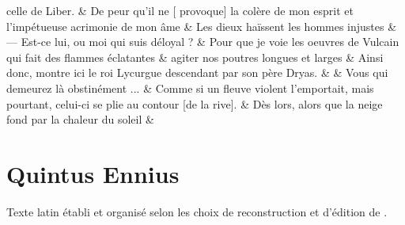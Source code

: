\documentclass[12pt,onecolumn,twoside,a4paper]{memoir}
\begin{document}
\begin{pairs}
\begin{Rightside}
                              celle de Liber. \&
                         \stanza 
                     De peur qu’il ne [ provoque] la colère de mon esprit et l’impétueuse
                              acrimonie de mon âme  \&
                         \stanza Les dieux haïssent les hommes injustes & 
                     — Est-ce lui, ou moi qui suis déloyal ? \&
                         \stanza 
                     Pour que je voie les oeuvres de Vulcain qui fait des flammes
                              éclatantes  \&
                         \stanza 
                     agiter nos poutres longues et larges \&
                         \stanza Ainsi donc, montre ici le roi Lycurgue descendant par son père
                              Dryas. & 
                      \&
                         \stanza 
                     Vous qui demeurez là obstinément ... \&
                         \stanza 
                     Comme si un fleuve violent l’emportait, mais pourtant, celui-ci se
                              plie au contour [de la rive]. \&
                         \stanza 
                     Dès lors, alors que la neige fond par la chaleur du soleil \&
                     
                  \endnumbering
		\end{Rightside}
               \end{pairs}
	\Columns
            
         
         
            \section{Quintus Ennius}
            Texte latin établi et organisé selon les choix de reconstruction et d'édition de \cite{EnniusLoeb}.\par
            
\end{document}
